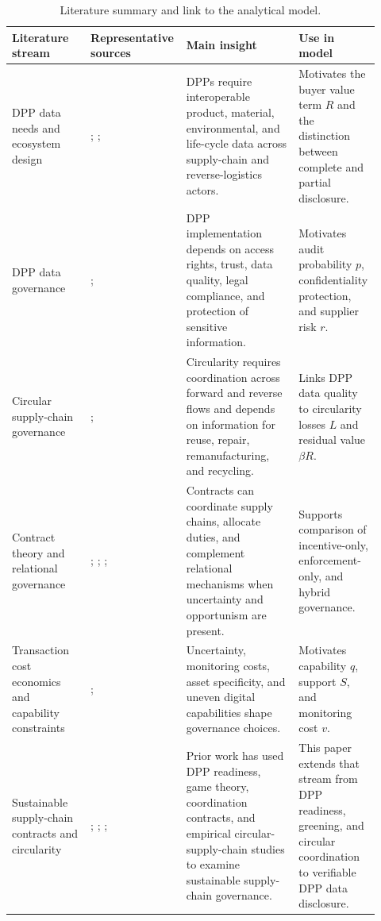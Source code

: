 \documentclass[final,5p,times,authoryear]{elsarticle}
\begin{document}
\begin{table}[t]
\centering
\begingroup
\setlength{\tabcolsep}{3pt}
\small
\caption{Literature summary and link to the analytical model.}
\label{tab:literature_summary}
\begin{tabular}{@{}p{0.21\linewidth}p{0.22\linewidth}p{0.30\linewidth}p{0.19\linewidth}@{}}
\toprule
Literature stream & Representative sources & Main insight & Use in model \\
\midrule
DPP data needs and ecosystem design & \citet{jensen2023digital}; \citet{king2023proposed}; \citet{lopes2024digital} & DPPs require interoperable product, material, environmental, and life-cycle data across supply-chain and reverse-logistics actors. & Motivates the buyer value term $R$ and the distinction between complete and partial disclosure. \\
DPP data governance & \citet{ducuing2023data}; \citet{eu2024espr} & DPP implementation depends on access rights, trust, data quality, legal compliance, and protection of sensitive information. & Motivates audit probability $p$, confidentiality protection, and supplier risk $r$. \\
Circular supply-chain governance & \citet{deangelis2018circular}; \citet{govindan2015reverse} & Circularity requires coordination across forward and reverse flows and depends on information for reuse, repair, remanufacturing, and recycling. & Links DPP data quality to circularity losses $L$ and residual value $\beta R$. \\
Contract theory and relational governance & \citet{cachon2003supply}; \citet{cachon2005supply}; \citet{poppo2002do}; \citet{malhotra2011trust} & Contracts can coordinate supply chains, allocate duties, and complement relational mechanisms when uncertainty and opportunism are present. & Supports comparison of incentive-only, enforcement-only, and hybrid governance. \\
Transaction cost economics and capability constraints & \citet{williamson2008outsourcing}; \citet{uruena2026digital} & Uncertainty, monitoring costs, asset specificity, and uneven digital capabilities shape governance choices. & Motivates capability $q$, support $S$, and monitoring cost $v$. \\
Sustainable supply-chain contracts and circularity & \citet{kolagar2026material}; \citet{doijjclepro201803046}; \citet{doijjclepro2022135135}; \citet{doijjclepro2021128629} & Prior work has used DPP readiness, game theory, coordination contracts, and empirical circular-supply-chain studies to examine sustainable supply-chain governance. & This paper extends that stream from DPP readiness, greening, and circular coordination to verifiable DPP data disclosure. \\
\bottomrule
\end{tabular}
\endgroup
\end{table}
\end{document}
